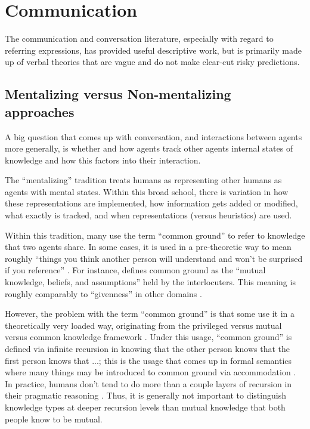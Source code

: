 \documentclass[]{article}
\begin{document}

\section{Communication}
The communication and conversation literature, especially with regard to referring expressions, has provided useful descriptive work, but is primarily made up of verbal theories that are vague and do not make clear-cut risky predictions. 

\subsection{Mentalizing versus Non-mentalizing approaches}

A big question that comes up with conversation, and interactions between agents more generally, is whether and how agents track other agents internal states of knowledge and how this factors into their interaction.

The ``mentalizing'' tradition treats humans as representing other humans as agents with mental states. Within this broad school, there is variation in how these representations are implemented, how information gets added or modified, what exactly is tracked, and when representations (versus heuristics) are used. 

Within this tradition, many use the term ``common ground'' to refer to knowledge that two agents share. In some cases, it is used in a pre-theoretic way to mean roughly ``things you think another person will understand and won't be surprised if you reference'' \citep{leung2023, garrison2022}. For instance,  \citet{hanna2003} defines common ground as the ``mutual knowledge, beliefs, and assumptions'' held by the interlocuters. This meaning is roughly comparably to ``givenness'' in other domains \citep{fay2010}. 

 However, the problem with the term ``common ground'' is that some use it in a theoretically very loaded way, originating from the privileged versus mutual versus common knowledge framework \citep{clark1996}. Under this usage, ``common ground'' is defined via infinite recursion in knowing that the other person knows that the first person knows that ...; this is the usage that comes up in formal semantics where many things may be introduced to common ground via accommodation \citep{horton1996, pickering2004}. In practice, humans don't tend to do more than a couple layers of recursion in their pragmatic reasoning \citep{franke2016}. Thus, it is generally not important to distinguish knowledge types at deeper recursion levels than mutual knowledge that both people know to be mutual. 
\end{document}
